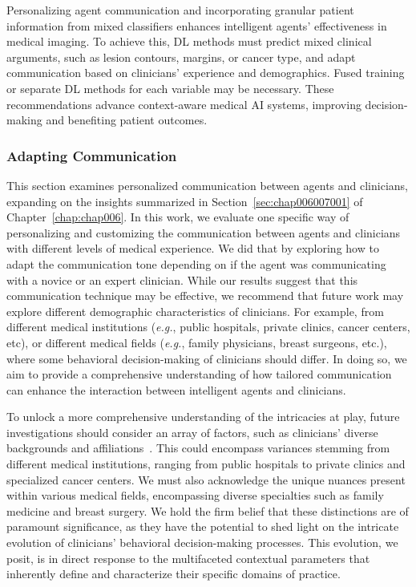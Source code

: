 Personalizing agent communication and incorporating granular patient information from mixed classifiers enhances intelligent agents' effectiveness in medical imaging.
To achieve this, \ac{DL} methods must predict mixed clinical arguments, such as lesion contours, margins, or cancer type, and adapt communication based on clinicians' experience and demographics.
Fused training or separate \ac{DL} methods for each variable may be necessary.
These recommendations advance context-aware medical \ac{AI} systems, improving decision-making and benefiting patient outcomes.

\subsubsection{Adapting Communication}
\label{sec:app005008001003}

This section examines personalized communication between agents and clinicians, expanding on the insights summarized in Section~\ref{sec:chap006007001} of Chapter~\ref{chap:chap006}.
In this work, we evaluate one specific way of personalizing and customizing the communication between agents and clinicians with different levels of medical experience.
We did that by exploring how to adapt the communication tone depending on if the agent was communicating with a novice or an expert clinician.
While our results suggest that this communication technique may be effective, we recommend that future work may explore different demographic characteristics of clinicians.
For example, from different medical institutions ({\it e.g.}, public hospitals, private clinics, cancer centers, etc), or different medical fields ({\it e.g.}, family physicians, breast surgeons, etc.), where some behavioral decision-making of clinicians should differ.
\textcolor{revised}{In doing so, we aim to provide a comprehensive understanding of how tailored communication can enhance the interaction between intelligent agents and clinicians.}

\textcolor{revised}{To unlock a more comprehensive understanding of the intricacies at play, future investigations should consider an array of factors, such as clinicians' diverse backgrounds and affiliations~\cite{LI2021106929}.
This could encompass variances stemming from different medical institutions, ranging from public hospitals to private clinics and specialized cancer centers.
We must also acknowledge the unique nuances present within various medical fields, encompassing diverse specialties such as family medicine and breast surgery.
We hold the firm belief that these distinctions are of paramount significance, as they have the potential to shed light on the intricate evolution of clinicians' behavioral decision-making processes.
This evolution, we posit, is in direct response to the multifaceted contextual parameters that inherently define and characterize their specific domains of practice.}

